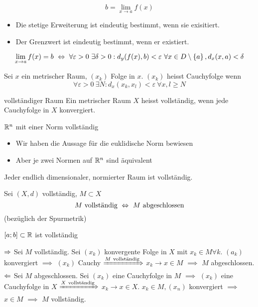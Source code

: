\begin{Not}
  \[b=\lim_{x\to a}f(x)\]
\end{Not}
\begin{Bem}
  \begin{itemize}
    \item Die stetige Erweiterung ist eindeutig bestimmt, wenn sie exisitiert.
    \item Der Grenzwert ist eindeutig bestimmt, wenn er existiert.
  \end{itemize}
\end{Bem}
\begin{Lem}
  \[\lim_{x\to a}f(x)=b\ \Lra\ \forall \varepsilon>0\ \exists \delta>0:d_y(f(x),b)<\varepsilon\ \forall x\in D\setminus \left\{ a \right\}, d_x(x,a)<\delta\]
\end{Lem}
\begin{Def}
  Sei $x$ ein metrischer Raum, $(x_k)$ Folge in $x$. $(x_k)$ heisst Cauchyfolge wenn
  \[\forall \varepsilon>0\ \exists N:d_x(x_k,x_l)<\varepsilon\ \forall x,l\geq N\]
\end{Def}
\begin{Def}{vollständiger Raum}
  Ein metrischer Raum $X$ heisst vollständig, wenn jede Cauchyfolge in $X$ konvergiert.
\end{Def}
\begin{Bsp}
  $\mathbb{R}^n$ mit einer Norm vollständig
\end{Bsp}
\begin{Bem}
  \begin{itemize}
    \item Wir haben die Aussage für die euklidische Norm bewiesen
    \item Aber je zwei Normen auf $\mathbb{R}^n$ sind äquivalent
  \end{itemize}
\end{Bem}
\begin{Bsp}
  Jeder endlich dimensionaler, normierter Raum ist vollständig.
\end{Bsp}
\begin{Lem}
  Sei $(X,d)$ vollständig, $M\subset X$
  \[M\ \text{vollständig}\ \Lra\ M\ \text{abgeschlossen}\]
  (bezüglich der Spurmetrik)
\end{Lem}
\begin{Bsp}
  $[a;b]\subset\mathbb{R}$ ist vollständig
\end{Bsp}
\begin{Bew}
  $\Rightarrow$ Sei $M$ vollständig. Sei $(x_k)$ konvergente Folge in $X$ mit $x_k\in M\forall k$. $(a_k)$ konvergiert $\implies$ $(x_k)$ Cauchy $\xRightarrow{M\ \text{vollständig}}$ $x_k\to x\in M$ $\implies$ $M$ abgeschlossen.\\
  $\Leftarrow$ Sei $M$ abgeschlossen. Sei $(x_k)$ eine Cauchyfolge in $M$ $\implies$ $(x_k)$ eine Cauchyfolge in $X$ $\xRightarrow{X\ \text{vollständig}}$ $x_k\to x\in X$. $x_k\in M,(x_n)$ konvergiert $\implies$ $x\in M$ $\implies$ $M$ vollständig.
\end{Bew}

